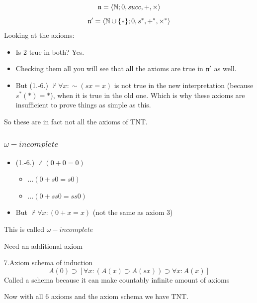 \documentclass[11pt]{article}
\begin{document}
$$\frak{n}=\langle\mathbb{N};0,succ,+,\times\rangle$$
$$\frak{n'}=\langle\mathbb{N}\cup\{*\};0,s^*,+^*,\times^*\rangle$$
Looking at the axioms: 
\begin{itemize}
\item Is 2 true in both? Yes.
\item Checking them all you will see that all the axioms are true in \(\frak{n'}\) as well.
\item But (1.-6.) \(\nvdash \forall x: \sim (sx = x)\) is not true in the new interpretation (because \(s^*(*)=*\)), when it is true in the old one. Which is why these axioms are insufficient to prove things as simple as this.
\end{itemize}
So these are in fact not all the axioms of TNT.

\subsubsection{\(\omega-incomplete\)}
\label{sec:org36880d7}
\begin{itemize}
\item (1.-6.) \(\nvdash (0+0=0)\)
\begin{itemize}
\item \(\ldots (0+s0=s0)\)
\item \(\ldots (0+ss0=ss0)\)
\end{itemize}
\item But \(\nvdash \forall x: (0+x=x)\) (not the same as axiom 3)
\end{itemize}
This is called \(\omega-incomplete\)

Need an additional axiom

7.Axiom schema of induction
$$A(0) \supset [\forall x:(A(x)\supset A(sx))\supset \forall x:A(x)]$$
Called a schema because it can make countably infinite amount of axioms

Now with all 6 axioms and the axiom schema we have TNT.
\end{document}
